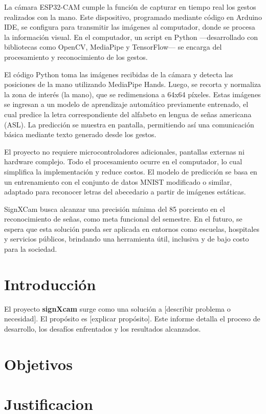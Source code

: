\documentclass[a4paper,12pt]{article}
\begin{document}
La cámara ESP32-CAM cumple la función de capturar en tiempo real los gestos realizados con la mano. Este dispositivo, programado mediante código en Arduino IDE, se configura para transmitir las imágenes al computador, donde se procesa la información visual. En el computador, un script en Python —desarrollado con bibliotecas como OpenCV, MediaPipe y TensorFlow— se encarga del procesamiento y reconocimiento de los gestos.

El código Python toma las imágenes recibidas de la cámara y detecta las posiciones de la mano utilizando MediaPipe Hands. Luego, se recorta y normaliza la zona de interés (la mano), que se redimensiona a 64x64 píxeles. Estas imágenes se ingresan a un modelo de aprendizaje automático previamente entrenado, el cual predice la letra correspondiente del alfabeto en lengua de señas americana (ASL). La predicción se muestra en pantalla, permitiendo así una comunicación básica mediante texto generado desde los gestos.

El proyecto no requiere microcontroladores adicionales, pantallas externas ni hardware complejo. Todo el procesamiento ocurre en el computador, lo cual simplifica la implementación y reduce costos. El modelo de predicción se basa en un entrenamiento con el conjunto de datos MNIST modificado o similar, adaptado para reconocer letras del abecedario a partir de imágenes estáticas.

SignXCam busca alcanzar una precisión mínima del 85 porciento en el reconocimiento de señas, como meta funcional del semestre. En el futuro, se espera que esta solución pueda ser aplicada en entornos como escuelas, hospitales y servicios públicos, brindando una herramienta útil, inclusiva y de bajo costo para la sociedad.
\tableofcontents
\newpage

\section{Introducción}
El proyecto \textbf{signXcam} surge como una solución a [describir problema o necesidad]. El propósito es [explicar propósito]. Este informe detalla el proceso de desarrollo, los desafíos enfrentados y los resultados alcanzados.

\section{Objetivos}

\section{Justificacion}
\end{document}

